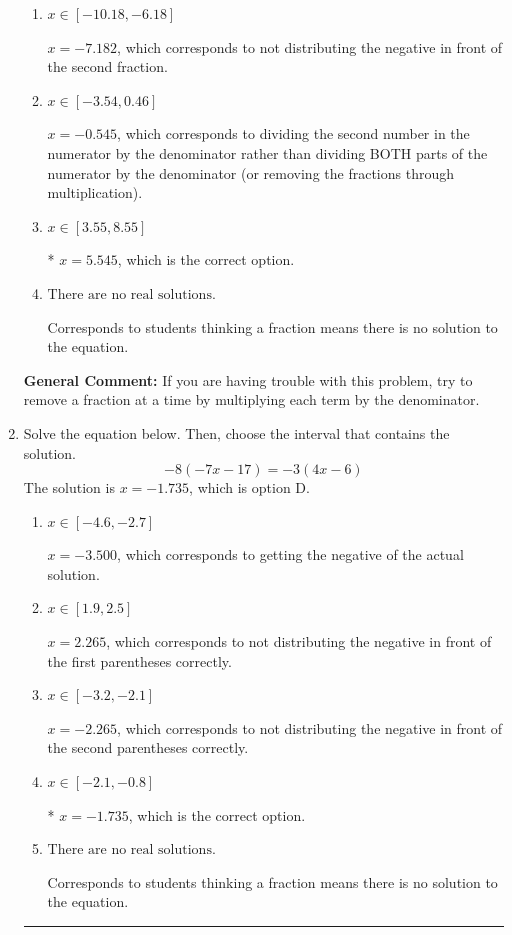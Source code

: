 \documentclass{extbook}[14pt]
\newcommand{\litem}[1]{\item #1

\rule{\textwidth}{0.4pt}}
\begin{document}
\begin{enumerate}
{\begin{enumerate}[label=\Alph*.]
 $x = 15.273$, which corresponds to dividing the coefficients in front of x by the denominator rather than dividing BOTH parts of the numerator by the denominator (or removing the fractions through multiplication).
\item \( x \in [-10.18, -6.18] \)

 $x = -7.182$, which corresponds to not distributing the negative in front of the second fraction.
\item \( x \in [-3.54, 0.46] \)

 $x = -0.545$, which corresponds to dividing the second number in the numerator by the denominator rather than dividing BOTH parts of the numerator by the denominator (or removing the fractions through multiplication).
\item \( x \in [3.55, 8.55] \)

* $x = 5.545$, which is the correct option.
\item \( \text{There are no real solutions.} \)

Corresponds to students thinking a fraction means there is no solution to the equation.
\end{enumerate}

\textbf{General Comment:} If you are having trouble with this problem, try to remove a fraction at a time by multiplying each term by the denominator.
}
\litem{
Solve the equation below. Then, choose the interval that contains the solution.
\[ -8(-7x -17) = -3(4x -6) \]The solution is \( x = -1.735 \), which is option D.\begin{enumerate}[label=\Alph*.]
\item \( x \in [-4.6, -2.7] \)

$x = -3.500$, which corresponds to getting the negative of the actual solution.
\item \( x \in [1.9, 2.5] \)

$x = 2.265$, which corresponds to not distributing the negative in front of the first parentheses correctly.
\item \( x \in [-3.2, -2.1] \)

$x = -2.265$, which corresponds to not distributing the negative in front of the second parentheses correctly.
\item \( x \in [-2.1, -0.8] \)

* $x = -1.735$, which is the correct option.
\item \( \text{There are no real solutions.} \)

Corresponds to students thinking a fraction means there is no solution to the equation.
\end{enumerate}

}
\end{enumerate}
\end{document}
